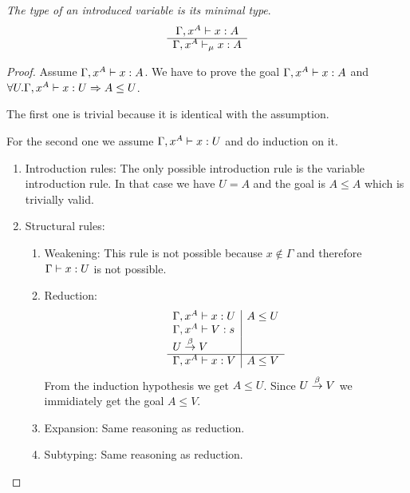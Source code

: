 \begin{lemma}
    \label{MinimalTypeOfVariable}
    \emph{The type of an introduced variable is its minimal type}.
    $$
    \begin{array}{c} 
        \Gamma,x^A \vdash x: A
     \\ \hline 
        \Gamma, x^A \vdash_\mu x: A
    \end{array}
    $$

    \begin{proof}
        Assume $\Gamma, x^A \vdash x: A$. We have to prove the goal
        $\Gamma, x^A \vdash x: A$ and
        $\forall U. \Gamma, x^A \vdash x: U \Rightarrow A \le U$.

        The first one is trivial because it is identical with the assumption.

        For the second one we assume $\Gamma, x^A \vdash x: U$ and do
        induction on it.
        \begin{enumerate}
            \item Introduction rules: The only possible introduction rule is the
                variable introduction rule. In that case we have $U = A$ and the
                goal is $A \le A$ which is trivially valid.

            \item Structural rules:
            \begin{enumerate}
                \item Weakening: This rule is not possible because $x \notin
                    \Gamma$ and therefore $\Gamma \vdash x: U$ is not possible.

                \item Reduction:
                $$
                \begin{array}{l|l}
                    \Gamma, x^A \vdash x: U
                    &
                    A \le U
                    \\
                    \Gamma, x^A \vdash V: s
                    \\
                    U \stackrel{\beta}{\to} V
                    \\
                    \hline
                    \Gamma, x^A \vdash x: V
                    &
                    A \le V
                \end{array}
                $$
                From the induction hypothesis we get $A \le U$. Since $U \stackrel{\beta}{\to}
                    V$ we immidiately get the goal $A \le V$.

                \item Expansion: Same reasoning as reduction.

                \item Subtyping: Same reasoning as reduction.
            \end{enumerate}
        \end{enumerate}
    \end{proof}
\end{lemma}



